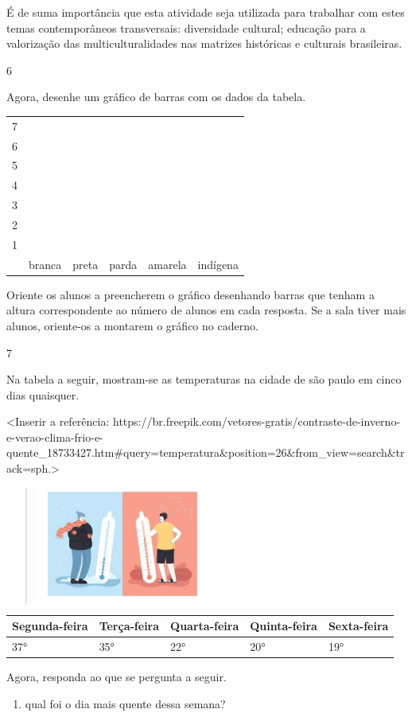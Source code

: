 É de suma importância que esta atividade seja utilizada para trabalhar com estes temas contemporâneos transversais: diversidade cultural; educação para a valorização das
multiculturalidades nas matrizes históricas e culturais brasileiras.

\num{6}

Agora, desenhe um gráfico de barras com os dados da tabela.

\begin{longtable}[]{@{}llllll@{}}
\toprule
7 & & & & &\tabularnewline
6 & & & & &\tabularnewline
5 & & & & &\tabularnewline
4 & & & & &\tabularnewline
3 & & & & &\tabularnewline
2 & & & & &\tabularnewline
1 & & & & &\tabularnewline
& branca & preta & parda & amarela & indígena\tabularnewline
\bottomrule
\end{longtable}

Oriente os alunos a preencherem o gráfico desenhando
barras que tenham a altura correspondente ao número de alunos em cada resposta.
Se a sala tiver mais alunos, oriente-os a montarem o gráfico no caderno.

\num{7}

Na tabela a seguir, mostram-se as temperaturas na cidade de são paulo em cinco
dias quaisquer.

\textless{}Inserir a referência:
https://br.freepik.com/vetores-gratis/contraste-de-inverno-e-verao-clima-frio-e-quente\_18733427.htm\#query=temperatura\&position=26\&from\_view=search\&track=sph.\textgreater{}

\begin{quote}
\includegraphics[width=2.20878in,height=1.47139in]{media/image104.jpg}
\end{quote}

\begin{longtable}[]{@{}lllll@{}}
\toprule
Segunda-feira & Terça-feira & Quarta-feira & Quinta-feira & Sexta-feira\tabularnewline
\midrule
\endhead
37° & 35° & 22° & 20° & 19°\tabularnewline
\bottomrule
\end{longtable}

Agora, responda ao que se pergunta a seguir.

\begin{enumerate}
\def\labelenumi{\Alph{enumi})}
\item
  qual foi o dia mais quente dessa semana?
\end{enumerate}

